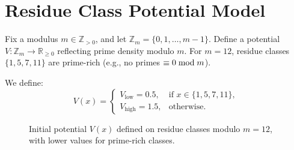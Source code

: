 \section{Residue Class Potential Model}
Fix a modulus \( m \in \mathbb{Z}_{>0} \), and let \( \mathbb{Z}_{m} = \{0, 1, \dots, m-1\} \). Define a potential \( V: \mathbb{Z}_{m} \to \mathbb{R}_{\geq 0} \) reflecting prime density modulo \( m \). For \( m = 12 \), residue classes \( \{1, 5, 7, 11\} \) are prime-rich (e.g., no primes \(\equiv 0 \bmod m\)).

We define:
\[
V(x) =
\begin{cases}
V_{\text{low}} = 0.5, & \text{if } x \in \{1, 5, 7, 11\}, \\
V_{\text{high}} = 1.5, & \text{otherwise}.
\end{cases}
\]

\begin{figure}[t]
\centering
{}
\caption{Initial potential $V(x)$ defined on residue classes modulo $m=12$, with lower values for prime-rich classes.}
\label{fig:initial_potential}
\end{figure}

